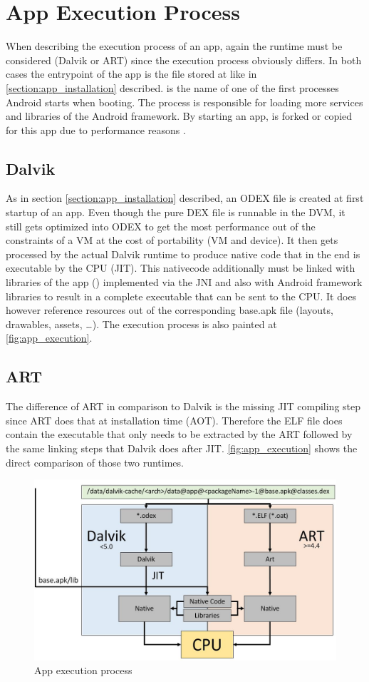 \section{App Execution Process}\label{section:app_execution}
When describing the execution process of an app, again the
runtime must be considered (Dalvik or ART) since the execution process
obviously differs. In both cases the entrypoint of the app is the
file stored at  like in
\autoref{section:app_installation} described.  is
the name of one of the first processes Android starts when booting.
The process is responsible for loading more services and libraries
of the Android framework. By starting an app,  is forked
or copied for this app due to performance reasons
\parencite{hackershandbook}.

\subsection{Dalvik}
As in section \autoref{section:app_installation} described, an
ODEX file is created at first startup of an app. Even though
the pure DEX file is runnable in the DVM, it still gets optimized
into ODEX to get the most performance out of the
constraints of a VM at the cost of portability (VM and device).
It then gets processed by the actual Dalvik runtime to produce
native code that in the end is executable by the CPU (JIT).
This nativecode additionally must be linked with libraries of the app
() implemented via the JNI
and also with Android framework libraries to result in a complete
executable that can be sent to the CPU. It does however
reference resources out of the corresponding base.apk file (layouts,
drawables, assets, \ldots). The execution process is also painted
at \autoref{fig:app_execution}.

\subsection{ART}
The difference of ART in comparison to Dalvik is the missing
JIT compiling step since ART does that at installation time
(AOT). Therefore the ELF file does contain the executable that
only needs to be extracted by the ART followed by the same
linking steps that Dalvik does after JIT. \autoref{fig:app_execution}
shows the direct comparison of those two runtimes.

\begin{figure}[htb]
  \includegraphics[width=\textwidth]{figures/app_execution}
  \caption[App execution process]{App execution process}
  \label{fig:app_execution}
\end{figure}

